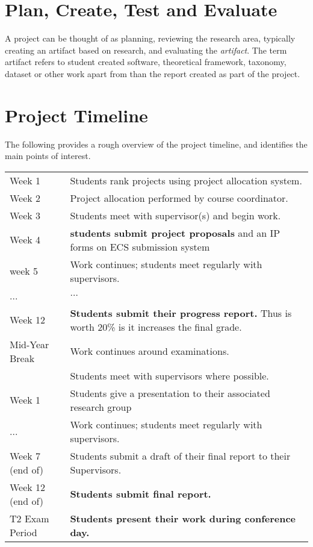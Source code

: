 \section{Plan, Create, Test and Evaluate}

A project can be thought of as planning, reviewing the research area, typically creating an artifact based on research,
and evaluating the {\em artifact}.  The term artifact
refers to student created software, theoretical framework, taxonomy, dataset or other work apart from than the report created as part of the project. 

\pagebreak
\section{Project Timeline}
The following provides a rough overview of the project timeline, and identifies the main points of interest.
\begin{center}
\begin{tabular}{|l|p{10cm}|}
\hline
Week 1 & {Students rank projects using project allocation system.}\\
Week 2 & Project allocation performed by course coordinator.\\
Week 3 & Students meet with supervisor(s) and begin work.\\
Week 4 & \textbf{ students submit project proposals} and an  IP forms on ECS submission system\\
week 5 & Work continues; students meet regularly with supervisors.\\
...&  $\ldots$\\
Week 12 & \textbf{Students submit their progress report.} Thus is worth 20\% is it increases the final grade.\\
\hline
\hline
Mid-Year Break& Work continues around examinations.\\
&Students meet with supervisors where possible.\\
\hline
\hline
Week 1 & {Students give a presentation to their associated research group}\\
...& Work continues; students meet regularly with supervisors.\\
Week 7 (end of)& {Students submit a draft of their final report to their Supervisors.}\\
Week 12 (end of)& \textbf{Students submit final report.}\\
\hline
\hline
T2 Exam Period & \textbf{Students present their work during conference day.}\\
\hline
\end{tabular}
\end{center}
